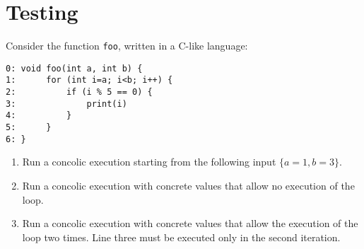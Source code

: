 \section{Testing}

Consider the function \texttt{foo}, written in a C-like language:
\begin{lstlisting}[style=C]
0: void foo(int a, int b) {
1:      for (int i=a; i<b; i++) {
2:          if (i % 5 == 0) {
3:              print(i)
4:          }
5:      }
6: }
\end{lstlisting}
\begin{enumerate}
    \item Run a concolic execution starting from the following input $\{a = 1, b = 3\}$. 
    \item Run a concolic execution with concrete values that allow no execution of the loop. 
    \item Run a concolic execution with concrete values that allow the execution of the loop two times. 
        Line three must be executed only in the second iteration. 
\end{enumerate}

